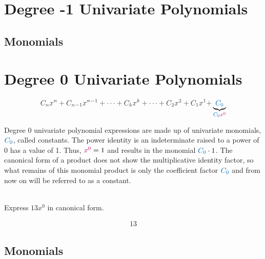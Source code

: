 \documentclass[20150903-160354-rs2.2-MarksMathNotebook.tex]{subfiles}
\begin{document}
\section{Degree -1 Univariate Polynomials}

\subsection*{Monomials}

\section{Degree 0 Univariate Polynomials}


\[
\cDarkGrey{C_{n}x^{n}+C_{n-1}x^{n-1}+ \cdots + C_{k}x^{k} + \cdots + C_{2}x^{2}+C_{1}x^{1}+}\underbrace{\cBlue{C_{0}}}_{\cBlue{C_{0}}\cRed{x^{0}}}
\]

Degree 0 univariate polynomial expressions are made up of univariate monomials, $\cBlue{C_{0}}$, called \alert{constants}.  The power identity is an indeterminate raised to a power of 0 has a value of 1.  Thus, $\cRed{x^{0}}=1$ and results in the monomial $\cBlue{C_{0}} \cdot 1$.  The canonical form of a product does not show the multiplicative identity factor, so what remains of this monomial product is only the coefficient factor $\cBlue{C_{0}}$ and from now on will be referred to as a \alert{constant}.

\begin{example}[id:20141121-093747] \label{20141121-093747} \hfill \\

Express $13x^0$ in canonical form.

\soln

\solnsteps
\begin{align*}
13 %
\end{align*}
\end{example}

\subsection*{Monomials}
\end{document}
